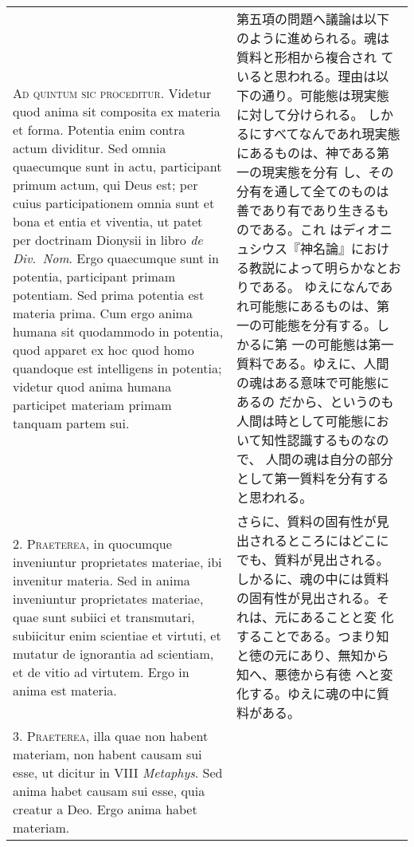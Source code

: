 \documentclass[paper=a4paper,fontsize=10pt,jafontsize=9pt,titlepage]{jlreq}
\begin{document}
\begin{longtable}{p{21em}p{21em}}

{\scshape Ad quintum sic proceditur}. Videtur quod anima sit composita
ex materia et forma. Potentia enim contra actum dividitur. Sed omnia
quaecumque sunt in actu, participant primum actum, qui Deus est; per
cuius participationem omnia sunt et bona et entia et viventia, ut
patet per doctrinam Dionysii in libro {\itshape de Div.~Nom}. Ergo quaecumque
sunt in potentia, participant primam potentiam. Sed prima potentia est
materia prima. Cum ergo anima humana sit quodammodo in potentia, quod
apparet ex hoc quod homo quandoque est intelligens in potentia;
videtur quod anima humana participet materiam primam tanquam partem
sui.


&

第五項の問題へ議論は以下のように進められる。魂は質料と形相から複合され
ていると思われる。理由は以下の通り。可能態は現実態に対して分けられる。
しかるにすべてなんであれ現実態にあるものは、神である第一の現実態を分有
し、その分有を通して全てのものは善であり有であり生きるものである。これ
はディオニュシウス『神名論』における教説によって明らかなとおりである。
ゆえになんであれ可能態にあるものは、第一の可能態を分有する。しかるに第
一の可能態は第一質料である。ゆえに、人間の魂はある意味で可能態にあるの
だから、というのも人間は時として可能態において知性認識するものなので、
人間の魂は自分の部分として第一質料を分有すると思われる。

\\



2. {\scshape Praeterea}, in quocumque inveniuntur proprietates
materiae, ibi invenitur materia. Sed in anima inveniuntur proprietates
materiae, quae sunt subiici et transmutari, subiicitur enim scientiae
et virtuti, et mutatur de ignorantia ad scientiam, et de vitio ad
virtutem. Ergo in anima est materia.


&

さらに、質料の固有性が見出されるところにはどこにでも、質料が見出される。
しかるに、魂の中には質料の固有性が見出される。それは、元にあることと変
 化することである。つまり知と徳の元にあり、無知から知へ、悪徳から有徳
 へと変化する。ゆえに魂の中に質料がある。

\\



3. {\scshape Praeterea}, illa quae non habent materiam, non habent
causam sui esse, ut dicitur in VIII {\itshape Metaphys}. Sed anima habet causam
sui esse, quia creatur a Deo. Ergo anima habet materiam.



\end{longtable}
\end{document}

